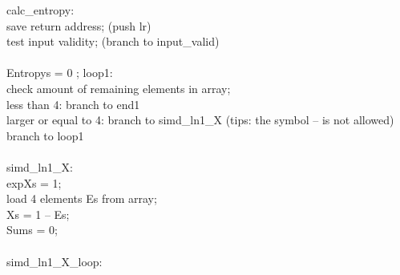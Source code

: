 \documentclass[11pt]{article}
\begin{document}
calc\_entropy:\\
	save return address; (push {lr})\\
	test input validity; (branch to input\_valid)\\\\
	Entropys = 0 ;
loop1:\\
	check amount of remaining elements in array;\\
	less than 4: branch to end1\\
	larger or equal to 4: branch to simd\_ln1\_X (tips: the symbol – is not allowed)\\
	branch to loop1\\\\
simd\_ln1\_X:\\
	expXs = 1;\\
	load 4 elements Es from array;\\
	Xs = 1 – Es;\\
	Sums = 0;\\\\
simd\_ln1\_X\_loop:\\
\end{document}
